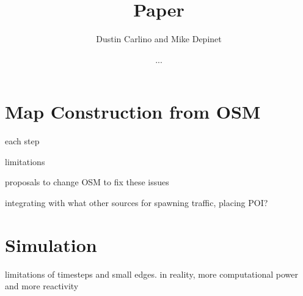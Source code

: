 \documentclass[12pt]{article}
\title{Paper}
\author{Dustin Carlino and Mike Depinet}
\date{...}
\begin{document}
\maketitle



\section{Map Construction from OSM}

each step

limitations

proposals to change OSM to fix these issues

integrating with what other sources for spawning traffic, placing POI?


\section{Simulation}

limitations of timesteps and small edges. in reality, more computational power
and more reactivity
\end{document}
